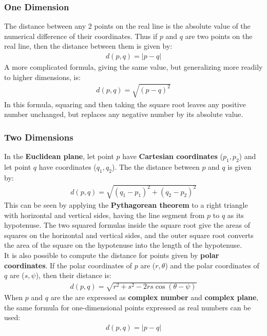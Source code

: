         \subsubsection{One Dimension}
            The distance between any 2 points on the real line is the absolute value of the numerical difference of their coordinates. Thus if $p$ and $q$ are two points on the real line, then the distance between them is given by:
            \begin{align}
                d(p,q) = |p - q|
            \end{align}
            A more complicated formula, giving the same value, but generalizing more readily to higher dimensions, is:
            \begin{align}
                d(p,q) = \sqrt{(p - q)^2}
            \end{align}
            In this formula, squaring and then taking the square root leaves any positive number unchanged, but replaces any negative number by its absolute value.
        \subsubsection{Two Dimensions}
            In the \textbf{Euclidean plane}, let point $p$ have \textbf{Cartesian coordinates} ($p_1, p_2$) and let point $q$ have coordinates ($q_1, q_2$). The the distance between $p$ and $q$ is given by:
            \begin{align}
                d(p,q) = \sqrt{(q_1 - p_1)^2 + (q_2 - p_2)^2}
            \end{align}
            This can be seen by applying the \textbf{Pythagorean theorem} to a right triangle with horizontal and vertical sides, having the line segment from $p$ to $q$ as its hypotenuse. The two squared formulas inside the square root give the areas of 
            squares on the horizontal and vertical sides, and the outer square root converts the area of the square on the hypotenuse into the length of the hypotenuse. \\ 
            \vspace{3mm}
            It is also possible to compute the distance for points given by \textbf{polar coordinates}. If the polar coordinates of $p$ are ($r, \theta$) and the polar coordinates of $q$ are ($s, \psi$), then their distance is:
            \begin{align}
                d(p,q) = \sqrt{r^2 + s^2 - 2rs\cos(\theta - \psi)}
            \end{align}
            When $p$ and $q$ are the are expressed as \textbf{complex number} and \textbf{complex plane}, the same formula for one-dimensional points expressed as real numbers can be used:
            \begin{align}
                d(p,q) = |p - q|
            \end{align}

